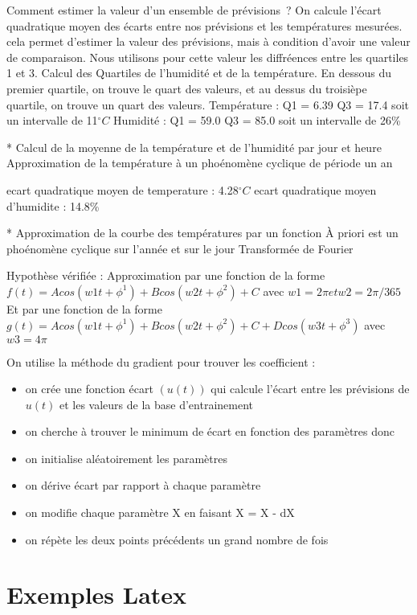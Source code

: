 \documentclass[11pt,a4paper]{article}
\begin{document}
{Comment estimer la valeur d'un ensemble de prévisions~? On calcule l'écart quadratique moyen des écarts entre nos prévisions et les températures mesurées. cela permet d'estimer la valeur des prévisions, mais à condition d'avoir une valeur de comparaison. Nous utilisons pour cette valeur les diffréences entre les quartiles 1 et 3. Calcul des Quartiles de l'humidité et de la température. En dessous du premier quartile, on trouve le quart des valeurs, et au dessus du troisièpe quartile, on trouve un quart des valeurs. 
Température : Q1 = 6.39  Q3 = 17.4  soit un intervalle de 11${}^{\circ}C$  
Humidité : 	  Q1 = 59.0  Q3 = 85.0  soit un intervalle de 26\%

* Calcul de la moyenne de la température et de l'humidité par jour et heure
Approximation de la température à un phoénomène cyclique de période un an

ecart quadratique moyen de temperature : 4.28${}^{\circ}C$
ecart quadratique moyen d'humidite : 14.8\%

* Approximation de la courbe des températures par un fonction
À priori est un phoénomène cyclique sur l'année et sur le jour
Transformée de Fourier

Hypothèse vérifiée :
Approximation par une fonction de la forme $f(t) = A cos (w1 t + \phi^1) + B cos (w2 t + \phi^2) + C$
avec $w1 = 2 \pi  et w2 = 2 \pi /365$
Et par une fonction de la forme $g(t) = A cos (w1 t + \phi^1) + B cos (w2 t + \phi^2) + C + D cos (w3 t + \phi^3)$
avec $w3 = 4 \pi$

On utilise la méthode du gradient pour trouver les coefficient :
\begin{itemize}
\item on crée une fonction écart $(u(t))$ qui calcule l'écart entre les prévisions de $u(t)$ et les valeurs de la base d'entrainement
\item on cherche à trouver le minimum de écart en fonction des paramètres donc
\item on initialise aléatoirement les paramètres
\item on dérive écart par rapport à chaque paramètre
\item on modifie chaque paramètre X en faisant X = X - dX
\item on répète les deux points précédents un grand nombre de fois
\end{itemize}


\section{Exemples Latex}
}
\end{document}
